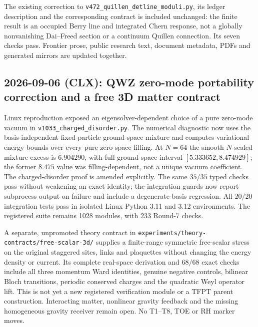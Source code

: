 \documentclass[11pt]{article}
\begin{document}
The existing correction to \texttt{v472\_quillen\_detline\_moduli.py},
its ledger description and the corresponding contract is included unchanged:
the finite result is an occupied Berry line and integrated Chern response,
not a globally nonvanishing Dai--Freed section or a continuum Quillen
connection. Its seven checks pass. Frontier prose, public research text,
document metadata, PDFs and generated mirrors are updated together.

\subsection*{2026-09-06 (CLX): QWZ zero-mode portability correction and a free 3D matter contract}
Linux reproduction exposed an eigensolver-dependent choice of a pure
zero-mode vacuum in \texttt{v1033\_charged\_disorder.py}. The numerical
diagnostic now uses the basis-independent fixed-particle ground-space mixture
and computes variational energy bounds over every pure zero-space filling.
At $N=64$ the smooth $N$-scaled mixture excess is $6.904290$, with full
ground-space interval $[5.333652,8.474929]$; the former $8.475$ value was
filling-dependent, not a unique vacuum coefficient. The charged-disorder
proof is amended explicitly. The same $35/35$ typed checks pass without
weakening an exact identity; the integration guards now report subprocess
output on failure and include a degenerate-basis regression. All $20/20$
integration tests pass in isolated Linux Python 3.11 and 3.12 environments.
The registered suite remains 1028 modules, with 233 Round-7 checks.

A separate, unpromoted theory contract in
\texttt{experiments/theory-contracts/free-scalar-3d/} supplies a finite-range
symmetric free-scalar stress on the original staggered sites, links and
plaquettes without changing the energy density or current. Its complete
real-space derivation and $68/68$ exact checks include all three momentum
Ward identities, genuine negative controls, bilinear Bloch transitions,
periodic conserved charges and the quadratic Weyl operator lift. This is
not yet a new registered verification module or a TFPT parent construction.
Interacting matter, nonlinear gravity feedback and the missing homogeneous
gravity receiver remain open. No T1--T8, TOE or RH marker moves.
\end{document}
